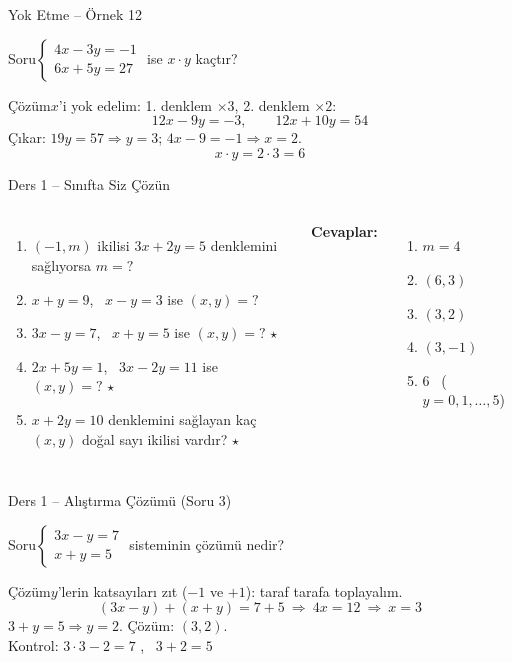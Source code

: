 \documentclass[aspectratio=169,11pt,handout]{beamer}
\newcommand{\soru}[3]{%
\begin{frame}{#1}
  \begin{block}{Soru}\large #2\end{block}
  \pause
  \begin{exampleblock}{Çözüm}\large #3\end{exampleblock}
\end{frame}}
\begin{document}
\soru{Yok Etme -- Örnek 12}
{\(\begin{cases}4x-3y=-1\\ 6x+5y=27\end{cases}\) \quad ise \(x\cdot y\) kaçtır?}
{\(x\)'i yok edelim: 1. denklem \(\times 3\), 2. denklem \(\times 2\):
\[12x-9y=-3,\qquad 12x+10y=54\]
Çıkar: \(19y=57\Rightarrow y=3\); \quad \(4x-9=-1\Rightarrow x=2\).
\[x\cdot y=2\cdot 3=6\]}

\begin{frame}{Ders 1 -- Sınıfta Siz Çözün}
\begin{columns}[t]
\begin{enumerate}
\item \((-1,m)\) ikilisi \(3x+2y=5\) denklemini sağlıyorsa \(m=?\)
\item \(x+y=9\), \ \(x-y=3\) ise \((x,y)=?\)
\item \(3x-y=7\), \ \(x+y=5\) ise \((x,y)=?\) \(\star\)
\item \(2x+5y=1\), \ \(3x-2y=11\) ise \((x,y)=?\) \(\star\)
\item \(x+2y=10\) denklemini sağlayan kaç \((x,y)\) doğal sayı ikilisi vardır? \(\star\)
\end{enumerate}
\pause
\textbf{Cevaplar:}
\begin{enumerate}
\item \(m=4\)
\item \((6,3)\)
\item \((3,2)\)
\item \((3,-1)\)
\item \(6\) \ (\(y=0,1,\dots,5\))
\end{enumerate}
\end{columns}
\vspace{4pt}{\footnotesize \(\star\) işaretli soruların adım adım çözümü sonraki slaytlardadır.}
\end{frame}

\soru{Ders 1 -- Alıştırma Çözümü (Soru 3)}
{\(\begin{cases}3x-y=7\\ x+y=5\end{cases}\) \quad sisteminin çözümü nedir?}
{\(y\)'lerin katsayıları zıt (\(-1\) ve \(+1\)): taraf tarafa toplayalım.
\[(3x-y)+(x+y)=7+5\ \Rightarrow\ 4x=12\ \Rightarrow\ x=3\]
\(3+y=5\Rightarrow y=2\). \quad Çözüm: \((3,2)\).\\[3pt]
Kontrol: \(3\cdot 3-2=7\) \checkmark, \ \(3+2=5\) \checkmark}
\end{document}

